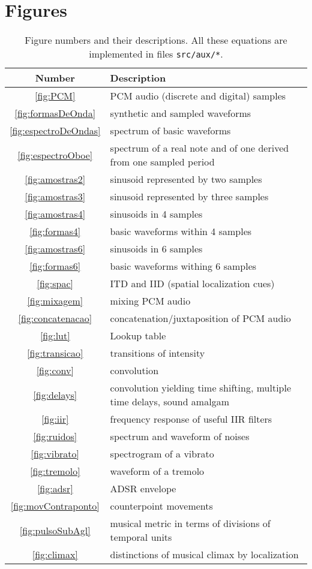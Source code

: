 \documentclass{scrreprt}
\newcommand*{\reff}[1]{%
	{\NoHyper\ref{#1}\endNoHyper}%
	  }
\begin{document}
\clearpage
\section{Figures}\label{sec:lfigures}

\begin{table*}[htp!]
\centering
\caption{Figure numbers and their descriptions.
All these equations are implemented in files \texttt{src/aux/*}.}
\begin{tabular}{ c | p{12cm} }
   Number & Description \\\hline
 \reff{fig:PCM} & PCM audio (discrete and digital) samples \\
 \reff{fig:formasDeOnda} & synthetic and sampled waveforms \\
 \reff{fig:espectroDeOndas} & spectrum of basic waveforms \\
 \reff{fig:espectroOboe} & spectrum of a real note and of one derived from one sampled period \\
 \reff{fig:amostras2} & sinusoid represented by two samples \\
 \reff{fig:amostras3} & sinusoid represented by three samples \\
 \reff{fig:amostras4} & sinusoids in 4 samples \\
 \reff{fig:formas4} & basic waveforms within 4 samples \\
 \reff{fig:amostras6} & sinusoids in 6 samples \\
 \reff{fig:formas6} & basic waveforms withing 6 samples \\
 \reff{fig:spac} & ITD and IID (spatial localization cues)\\
 \reff{fig:mixagem} & mixing PCM audio \\
 \reff{fig:concatenacao} & concatenation/juxtaposition of PCM audio \\
 \reff{fig:lut} & Lookup table \\
 \reff{fig:transicao} & transitions of intensity \\
 \reff{fig:conv} & convolution \\
 \reff{fig:delays} & convolution yielding time shifting, multiple time delays, sound amalgam \\
 \reff{fig:iir} & frequency response of useful IIR filters \\
 \reff{fig:ruidos} & spectrum and waveform of noises \\
 \reff{fig:vibrato} & spectrogram of a vibrato \\
 \reff{fig:tremolo} & waveform of a tremolo \\
 \reff{fig:adsr} & ADSR envelope \\
 \reff{fig:movContraponto} & counterpoint movements \\
 \reff{fig:pulsoSubAgl} & musical metric in terms of divisions of temporal units \\
 \reff{fig:climax} & distinctions of musical climax by localization \\
\end{tabular}
\end{table*}
\end{document}
